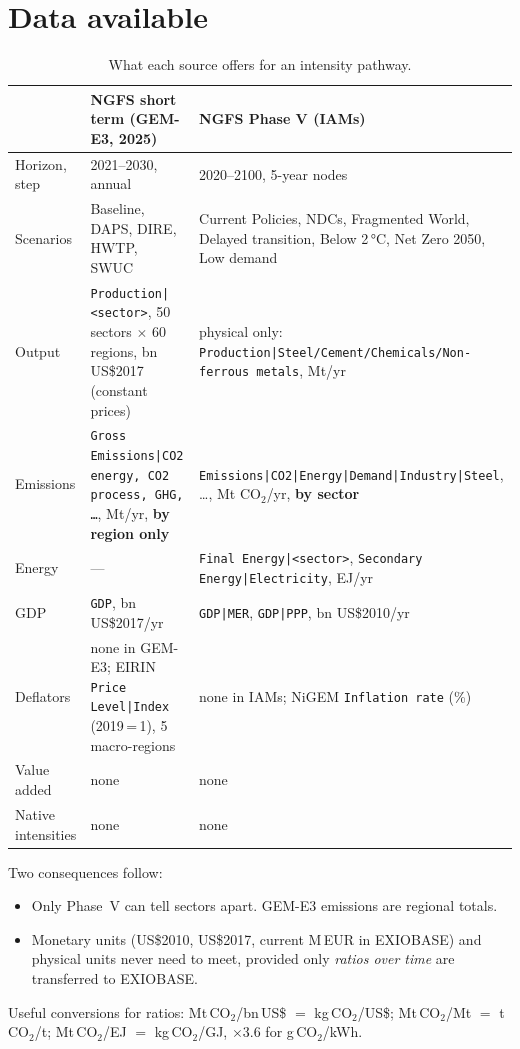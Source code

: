 \documentclass[11pt,a4paper]{article}
\newcommand{\var}[1]{\texttt{#1}}
\begin{document}
\section{Data available}

\begin{table}[h]
\centering\footnotesize
\begin{tabularx}{\textwidth}{@{}lLL@{}}
\toprule
 & \textbf{NGFS short term (GEM-E3, 2025)} & \textbf{NGFS Phase V (IAMs)} \\
\midrule
Horizon, step & 2021--2030, annual & 2020--2100, 5-year nodes \\
Scenarios & Baseline, DAPS, DIRE, HWTP, SWUC & Current Policies, NDCs, Fragmented World,
  Delayed transition, Below 2\,°C, Net Zero 2050, Low demand \\
Output & \var{Production|<sector>}, 50 sectors $\times$ 60 regions, bn US\$2017 (constant prices) &
  physical only: \var{Production|Steel/Cement/Chemicals/Non-ferrous metals}, Mt/yr \\
Emissions & \var{Gross Emissions|CO2 energy, CO2 process, GHG, \dots}, Mt/yr,
  \textbf{by region only} & \var{Emissions|CO2|Energy|Demand|Industry|Steel}, \dots, Mt CO$_2$/yr,
  \textbf{by sector} \\
Energy & --- & \var{Final Energy|<sector>}, \var{Secondary Energy|Electricity}, EJ/yr \\
GDP & \var{GDP}, bn US\$2017/yr & \var{GDP|MER}, \var{GDP|PPP}, bn US\$2010/yr \\
Deflators & none in GEM-E3; EIRIN \var{Price Level|Index} (2019\,=\,1), 5 macro-regions &
  none in IAMs; NiGEM \var{Inflation rate} (\%) \\
Value added & none & none \\
Native intensities & none & none \\
\bottomrule
\end{tabularx}
\caption{What each source offers for an intensity pathway.}
\label{tab:data}
\end{table}

Two consequences follow:
\begin{itemize}
  \item Only Phase~V can tell sectors apart. GEM-E3 emissions are regional
        totals.
  \item Monetary units (US\$2010, US\$2017, current M\,EUR in EXIOBASE) and
        physical units never need to meet, provided only \emph{ratios over
        time} are transferred to EXIOBASE.
\end{itemize}
Useful conversions for ratios: Mt\,CO$_2$/bn\,US\$ $=$ kg\,CO$_2$/US\$;
Mt\,CO$_2$/Mt $=$ t\,CO$_2$/t; Mt\,CO$_2$/EJ $=$ kg\,CO$_2$/GJ, $\times 3.6$
for g\,CO$_2$/kWh.
\end{document}
